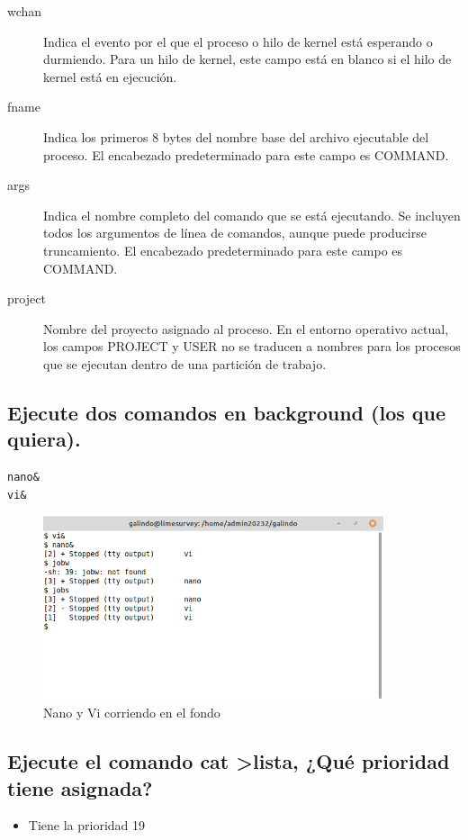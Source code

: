 \documentclass[11pt]{article}
\begin{document}
\begin{description}
\item[{wchan}] Indica el evento por el que el proceso o hilo de kernel está esperando o durmiendo. Para un hilo de kernel, este campo está en blanco si el hilo de kernel está en ejecución.

\item[{fname}] Indica los primeros 8 bytes del nombre base del archivo ejecutable del proceso. El encabezado predeterminado para este campo es COMMAND.

\item[{args}] Indica el nombre completo del comando que se está ejecutando. Se incluyen todos los argumentos de línea de comandos, aunque puede producirse truncamiento. El encabezado predeterminado para este campo es COMMAND.

\item[{project}] Nombre del proyecto asignado al proceso. En el entorno operativo actual, los campos PROJECT y USER no se traducen a nombres para los procesos que se ejecutan dentro de una partición de trabajo.
\end{description}

\subsection{Ejecute dos comandos en background (los que quiera).}
\label{sec:orgdc403e1}
\begin{verbatim}
nano&
vi&
\end{verbatim}

\begin{figure}[htbp]
\centering
\includegraphics[width=10cm]{img/nanovi.png}
\caption{Nano y Vi corriendo en el fondo}
\end{figure}

\subsection{Ejecute el comando cat >lista, ¿Qué prioridad tiene asignada?}
\label{sec:orga6e32d9}
\begin{itemize}
\item Tiene la prioridad 19
\end{itemize}
\end{document}
